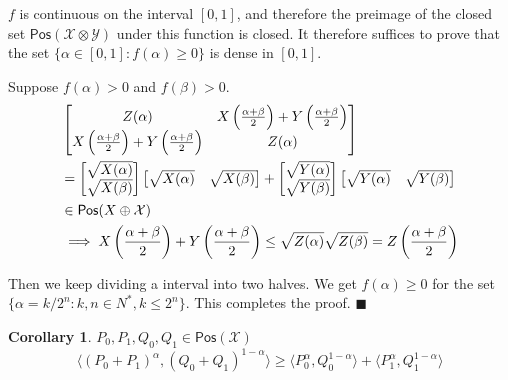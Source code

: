 \documentclass[aps,pra,onecolumn,notitlepage,superscriptaddress]{revtex4-1}
\newcommand{\spc}[1]{\mathcal{#1}}
\newcommand{\Pos}{\mathsf{Pos}}
\def\>{\rangle}
\def\<{\langle}
\newtheorem{cor}{Corollary}
\def\qed{$\blacksquare$ \newline}
\begin{document}
    $f$ is continuous on the interval $[0,1]$, and therefore the preimage of the
    closed set $\Pos(\spc X \otimes \spc Y)$ under this function is closed. It therefore suffices to prove that the set $\{ \alpha \in [0,1] : f(\alpha) \geq 0 \}$ is dense in $[0,1]$.

    Suppose $f(\alpha) > 0$ and $f(\beta) > 0$.
    \begin{align*}
        &\begin{bmatrix}
            Z(\alpha) & X\left( \frac{\alpha+\beta}{2} \right) + Y\left( \frac{\alpha+\beta}{2} \right) \\
            X\left( \frac{\alpha+\beta}{2} \right) + Y\left( \frac{\alpha+\beta}{2} \right) & Z(\alpha)
        \end{bmatrix} \\
        &=\begin{bmatrix} \sqrt{X(\alpha)} \\ \sqrt{X(\beta)} \end{bmatrix}
        \begin{bmatrix} \sqrt{X(\alpha)} & \sqrt{X(\beta)} \end{bmatrix}+
        \begin{bmatrix} \sqrt{Y(\alpha)} \\ \sqrt{Y(\beta)} \end{bmatrix}
        \begin{bmatrix} \sqrt{Y(\alpha)} & \sqrt{Y(\beta)} \end{bmatrix} \\
        &\in \Pos(\sc X \oplus \spc X) \\
        &\implies X\left( \frac{\alpha+\beta}{2} \right) + Y\left( \frac{\alpha+\beta}{2} \right) \leq \sqrt{Z(\alpha)} \sqrt{Z(\beta)} = Z\left( \frac{\alpha+\beta}{2} \right)
    \end{align*}

    Then we keep dividing a interval into two halves. We get $f(\alpha) \geq 0$ for the set $\{ \alpha = k/2^n : k,n \in N^*, k \leq 2^n \}$. This completes the proof.    
    \qed

    \begin{cor}
        $P_0,P_1,Q_0,Q_1 \in \Pos(\spc X)$
        \begin{equation}
            \< (P_0+P_1)^\alpha, (Q_0+Q_1)^{1-\alpha} \> \geq \< P_0^\alpha, Q_0^{1-\alpha} \> + \< P_1^\alpha, Q_1^{1-\alpha} \>
        \end{equation}
    \end{cor}
\end{document}
